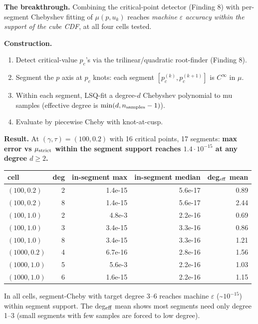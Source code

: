 \documentclass[11pt]{article}
\begin{document}
\textbf{The breakthrough.} Combining the critical-point detector
(Finding 8) with per-segment Chebyshev fitting of $\mu(p, u_k)$
reaches \emph{machine $\varepsilon$ accuracy within the support of
the cube CDF}, at all four cells tested.

\textbf{Construction.}
\begin{enumerate}\itemsep1pt
  \item Detect critical-value $p_c$'s via the trilinear/quadratic
        root-finder (Finding 8).
  \item Segment the $p$ axis at $p_c$ knots: each segment
        $[p_c^{(k)}, p_c^{(k+1)}]$ is $C^\infty$ in $\mu$.
  \item Within each segment, LSQ-fit a degree-$d$ Chebyshev polynomial
        to mu samples (effective degree is $\min(d, n_{\rm samples}-1)$).
  \item Evaluate by piecewise Cheby with knot-at-cusp.
\end{enumerate}

\textbf{Result.} At $(\gamma, \tau) = (100, 0.2)$ with 16 critical
points, 17 segments: \textbf{max error vs $\mu_{\rm strict}$ within
the segment support reaches $1.4 \cdot 10^{-15}$ at any degree
$d \ge 2$.}

\begin{center}\begin{tabular}{lrrrr}\toprule
cell & deg & in-segment max & in-segment median & deg$_{\rm eff}$ mean \\
\midrule
$(100, 0.2)$  & 2 & 1.4e-15 & 5.6e-17 & 0.89 \\
$(100, 0.2)$  & 8 & 1.4e-15 & 5.6e-17 & 2.44 \\
\midrule
$(100, 1.0)$  & 2 & 4.8e-3  & 2.2e-16 & 0.69 \\
$(100, 1.0)$  & 3 & 3.4e-15 & 3.3e-16 & 0.86 \\
$(100, 1.0)$  & 8 & 3.4e-15 & 3.3e-16 & 1.21 \\
\midrule
$(1000, 0.2)$ & 4 & 6.7e-16 & 2.8e-16 & 1.56 \\
\midrule
$(1000, 1.0)$ & 5 & 5.6e-3  & 2.2e-16 & 1.03 \\
$(1000, 1.0)$ & 6 & 1.6e-15 & 2.2e-16 & 1.15 \\
\bottomrule\end{tabular}\end{center}

In all cells, segment-Cheby with target degree 3--6 reaches machine
$\varepsilon$ (\textasciitilde$10^{-15}$) within segment support. The
deg$_{\rm eff}$ mean shows most segments need only degree 1--3 (small
segments with few samples are forced to low degree).
\end{document}
